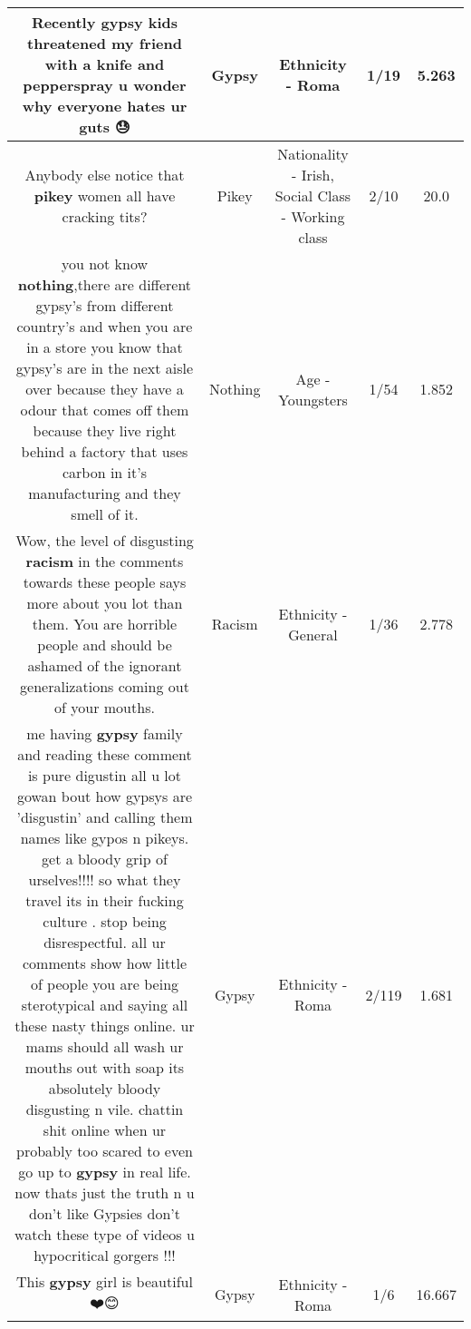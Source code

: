\documentclass[11pt]{article}
\newlength\mylength
\begin{document}
\begin{center}
\begin{longtable}{|C{.65\mylength}|C{.30\mylength}|C{.12\mylength}|C{.12\mylength}|C{.12\mylength}|}
  \small Recently \textbf{gypsy} kids threatened my friend with a knife and pepperspray u wonder why everyone hates ur guts 😓\normalsize   & Gypsy & Ethnicity - Roma & 1/19 & 5.263 \\  \hline
  \small Anybody else notice that \textbf{p\textbf{ikey}} women all have cracking tits?\normalsize   & Pikey & Nationality - Irish, Social Class - Working class & 2/10 & 20.0 \\  \hline
  \small you not know \textbf{nothing},there are different gypsy's from different country's and when you are in a store you know that gypsy's are in the next aisle over because they have a odour that comes off them because they live right behind a factory that uses carbon in it's manufacturing and they smell of it.\normalsize   & Nothing & Age - Youngsters & 1/54 & 1.852 \\  \hline
  \small Wow, the level of disgusting \textbf{racism} in the comments towards these people says more about you lot than them. You are horrible people and should be ashamed of the ignorant generalizations coming out of your mouths.\normalsize   & Racism & Ethnicity - General & 1/36 & 2.778 \\  \hline
  \small me having \textbf{gypsy} family and reading these comment is pure digustin  all u lot gowan bout how gypsys are 'disgustin' and calling them names like gypos n pikeys. get a bloody grip of urselves!!!! so what they travel its in their fucking culture . stop being disrespectful. all ur comments show how little of people you are being sterotypical and saying all these nasty things online. ur mams should all wash ur mouths out with soap its absolutely bloody disgusting n vile. chattin shit online when ur probably too scared to even go up to \textbf{gypsy} in real life. now thats just the truth n u don't like Gypsies don't watch these type of videos u hypocritical gorgers !!!\normalsize   & Gypsy & Ethnicity - Roma & 2/119 & 1.681 \\  \hline
  \small This \textbf{gypsy} girl is beautiful ❤️😊\normalsize   & Gypsy & Ethnicity - Roma & 1/6 & 16.667 \\  \hline

\end{longtable}
\end{center}
\end{document}
